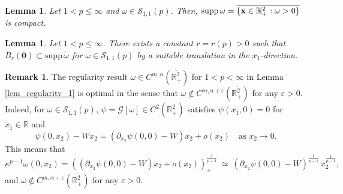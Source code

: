 \documentclass[10pt,a4paper]{amsart}
\newtheorem{lemma}[theorem]{Lemma}
\theoremstyle{definition}
\theoremstyle{definition}
\newtheorem{remark}[theorem]{Remark}
\numberwithin{equation}{section}
\newcommand{\supp}{{\mathrm{supp}}\,}
\newcommand{\0}{\emptyset}
\newcommand{\bfx}{{\bf x}}
\newcommand{\bbR}{\mathbb R}
\newcommand{\calS}{\mathcal S}
\begin{document}
\setcounter{section}{4}
\setcounter{equation}{4}
\setcounter{theorem}{4}
			\begin{lemma}
				\label{lem_cpt_support}
				Let $1<p\leq \infty$ and $\omega \in \calS_{1,1}(p)$. Then, $\supp \omega = \overline{ \{ \bfx \in \bbR^2_+: \omega > 0 \} }$ is compact.
			\end{lemma}

\setcounter{section}{4}
\setcounter{equation}{7}
\setcounter{theorem}{8}
			\begin{lemma}
				\label{prop_touching}    
				Let $1<p \leq \infty$. There exists a constant $r = r(p) > 0$ such that $B_{r}(\mathbf{0}) \subset \supp \widetilde{\omega}$ for $\omega \in \calS_{1,1}({p})$ by a suitable translation in the $x_1$-direction.
			\end{lemma}

\setcounter{section}{4}
\setcounter{equation}{7}
\setcounter{theorem}{9}
			\begin{remark}
				\label{rmk_optimal_regularity}
				The regularity result ${\omega} \in C^{m, \alpha}(\overline{\bbR^2_{+}})$ for $1<p< \infty$ in Lemma \ref{lem_regularity_1} is optimal in the sense that ${\omega} \notin C^{m, \alpha+\varepsilon}(\overline{\bbR^2_{+}})$ for any $\varepsilon > 0$.
				Indeed, for $\omega \in \calS_{1,1}(p)$, $\psi=\mathcal{G}[\omega] \in C^2(\overline{\mathbb{R}^2_+})$ satisfies $\psi(x_1, 0) = 0$ for $x_1 \in \mathbb{R}$ and  
				\[
				\psi(0, x_2)-Wx_2 = (\partial_{x_2}\psi(0,0)-W)x_2 + o(x_2) \quad \textrm{as}\,\, x_2\to0.
				\]
				This means that 
				\[
				\kappa^{p-1} \omega(0, x_2) = \left( (\partial_{x_2}\psi(0,0) - W)x_2+ o(x_2)\right)^{\frac{1}{p - 1}}_+ 
				\ \simeq \ (\partial_{x_2}\psi(0,0) - W)^{\frac{1}{p - 1}} \, x_2^{\frac{1}{p - 1}},
				\]
				and ${\omega}\notin C^{m, \alpha+ \varepsilon}(\overline{\bbR^2_{+}})$ for any $\varepsilon > 0$. 
			\end{remark}
\end{document}
